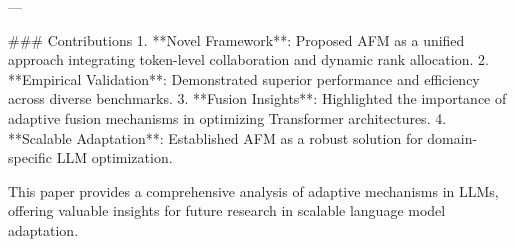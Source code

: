 ---

### Contributions  
1. **Novel Framework**: Proposed AFM as a unified approach integrating token-level collaboration and dynamic rank allocation.
2. **Empirical Validation**: Demonstrated superior performance and efficiency across diverse benchmarks.
3. **Fusion Insights**: Highlighted the importance of adaptive fusion mechanisms in optimizing Transformer architectures.
4. **Scalable Adaptation**: Established AFM as a robust solution for domain-specific LLM optimization.

This paper provides a comprehensive analysis of adaptive mechanisms in LLMs, offering valuable insights for future research in scalable language model adaptation.
